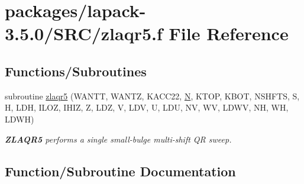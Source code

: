 \hypertarget{zlaqr5_8f}{}\section{packages/lapack-\/3.5.0/\+S\+R\+C/zlaqr5.f File Reference}
\label{zlaqr5_8f}
\subsection*{Functions/\+Subroutines}
\begin{DoxyCompactItemize}
\item 
subroutine \hyperlink{zlaqr5_8f_a1c560f9c454fa87a921c870440d0e522}{zlaqr5} (W\+A\+N\+T\+T, W\+A\+N\+T\+Z, K\+A\+C\+C22, \hyperlink{polmisc_8c_a0240ac851181b84ac374872dc5434ee4}{N}, K\+T\+O\+P, K\+B\+O\+T, N\+S\+H\+F\+T\+S, S, H, L\+D\+H, I\+L\+O\+Z, I\+H\+I\+Z, Z, L\+D\+Z, V, L\+D\+V, U, L\+D\+U, N\+V, W\+V, L\+D\+W\+V, N\+H, W\+H, L\+D\+W\+H)
\begin{DoxyCompactList}\small\item\em {\bfseries Z\+L\+A\+Q\+R5} performs a single small-\/bulge multi-\/shift Q\+R sweep. \end{DoxyCompactList}\end{DoxyCompactItemize}


\subsection{Function/\+Subroutine Documentation}
\hypertarget{zlaqr5_8f_a1c560f9c454fa87a921c870440d0e522}{}
